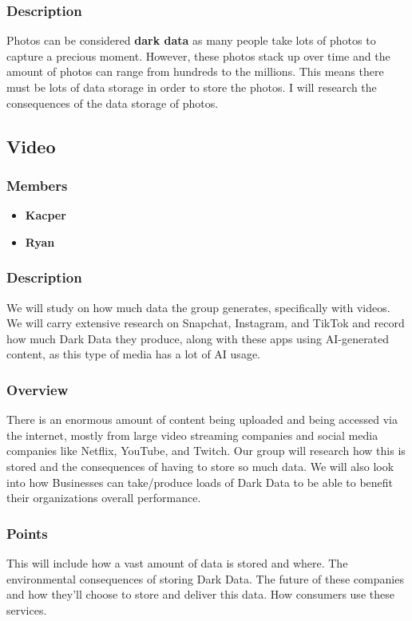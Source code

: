\documentclass{article}
\begin{document}
        \subsubsection{Description}
        Photos can be considered \textbf{dark data} as many people take lots of photos to capture a precious moment. However, these photos stack up over time and the amount of photos can range from hundreds to the millions. This means there must be lots of data storage in order to store the photos.
        I will research the consequences of the data storage of photos.

    \subsection{Video}
        \subsubsection{Members}
        \begin{itemize}
            \item \textbf{Kacper}
            \item \textbf{Ryan}
        \end{itemize}
        \subsubsection{Description}
        We will study on how much data the group generates, specifically with videos. We will carry extensive research on Snapchat, Instagram, and TikTok and record how much Dark Data they produce, along with these apps using AI-generated content, as this type of media has a lot of AI usage.

        \subsubsection{Overview}
        There is an enormous amount of content being uploaded and being accessed via the internet, mostly from large video 
        streaming companies and social media companies like Netflix, YouTube, and Twitch. Our group will research
        how this is stored and the consequences of having to store so much data. We will also look into how Businesses can
        take/produce loads of Dark Data to be able to benefit their organizations overall performance.

        \subsubsection{Points}
        This will include how a vast amount of data is stored and where. 
        The environmental consequences of storing Dark Data.
        The future of these companies and how they'll choose to store and deliver this data.
        How consumers use these services.
\end{document}
